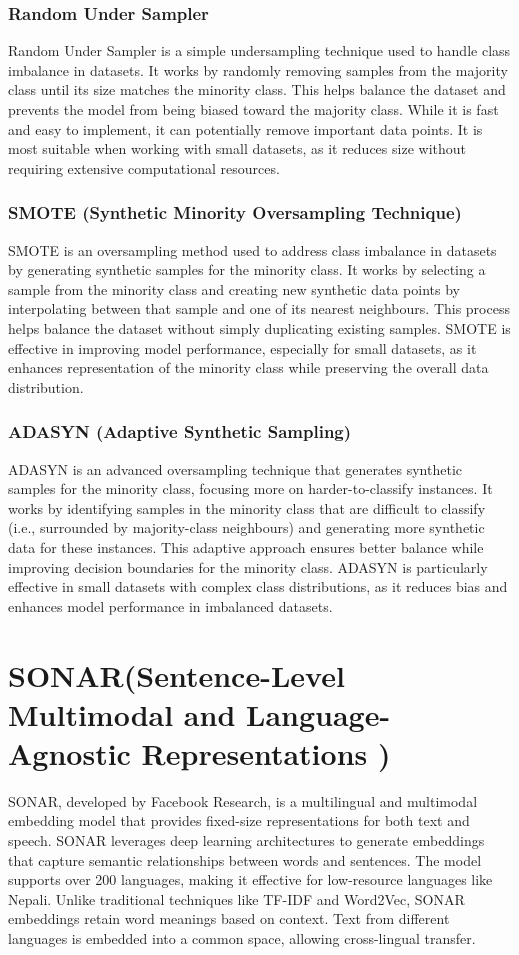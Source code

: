 \subsubsection{Random Under Sampler}
Random Under Sampler is a simple undersampling technique used to handle class imbalance in datasets. It works by randomly removing samples from the majority class until its size matches the minority class. This helps balance the dataset and prevents the model from being biased toward the majority class. While it is fast and easy to implement, it can potentially remove important data points. It is most suitable when working with small datasets, as it reduces size without requiring extensive computational resources.

\subsubsection{SMOTE (Synthetic Minority Oversampling Technique)}
SMOTE is an oversampling method used to address class imbalance in datasets by generating synthetic samples for the minority class. It works by selecting a sample from the minority class and creating new synthetic data points by interpolating between that sample and one of its nearest neighbours. This process helps balance the dataset without simply duplicating existing samples. SMOTE is effective in improving model performance, especially for small datasets, as it enhances representation of the minority class while preserving the overall data distribution.

\subsubsection{ADASYN (Adaptive Synthetic Sampling)}
ADASYN is an advanced oversampling technique that generates synthetic samples for the minority class, focusing more on harder-to-classify instances. It works by identifying samples in the minority class that are difficult to classify (i.e., surrounded by majority-class neighbours) and generating more synthetic data for these instances. This adaptive approach ensures better balance while improving decision boundaries for the minority class. ADASYN is particularly effective in small datasets with complex class distributions, as it reduces bias and enhances model performance in imbalanced datasets.

\section{SONAR(Sentence-Level Multimodal and Language-Agnostic Representations )}
SONAR, developed by Facebook Research, is a multilingual and multimodal embedding model that provides fixed-size representations for both text and speech.
SONAR leverages deep learning architectures to generate embeddings that capture semantic relationships between words and sentences. The model supports over 200 languages, making it effective for low-resource languages like Nepali.
Unlike traditional techniques like TF-IDF and Word2Vec, SONAR embeddings retain word meanings based on context.
Text from different languages is embedded into a common space, allowing cross-lingual transfer.
